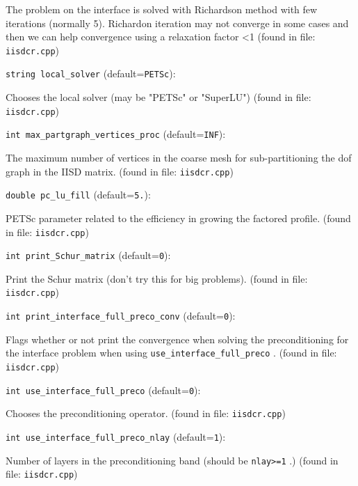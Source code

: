 The problem on the interface is solved with Richardson method
with few iterations (normally 5). Richardon iteration may not
converge in some cases and then we can help convergence using a
relaxation factor <1
 (found in file: \verb+iisdcr.cpp+)
\item\verb+string local_solver+ {\rm(default=\verb|PETSc|)}:

Chooses the local solver (may be "PETSc" or "SuperLU")
 (found in file: \verb+iisdcr.cpp+)
\item\verb+int max_partgraph_vertices_proc+ {\rm(default=\verb|INF|)}:

The maximum number of vertices in the coarse mesh for
sub-partitioning the dof graph in the IISD matrix. 
 (found in file: \verb+iisdcr.cpp+)
\item\verb+double pc_lu_fill+ {\rm(default=\verb|5.|)}:

PETSc parameter related to the efficiency in growing
  the factored profile.
 (found in file: \verb+iisdcr.cpp+)
\item\verb+int print_Schur_matrix+ {\rm(default=\verb|0|)}:

Print the Schur matrix (don't try this for big problems).
 (found in file: \verb+iisdcr.cpp+)
\item\verb+int print_interface_full_preco_conv+ {\rm(default=\verb|0|)}:

Flags whether or not print the convergence when solving the
preconditioning for the interface problem when using
 \verb+use_interface_full_preco+ .
 (found in file: \verb+iisdcr.cpp+)
\item\verb+int use_interface_full_preco+ {\rm(default=\verb|0|)}:

Chooses the preconditioning operator. 
 (found in file: \verb+iisdcr.cpp+)
\item\verb+int use_interface_full_preco_nlay+ {\rm(default=\verb|1|)}:

Number of layers in the preconditioning band (should
 be  \verb+nlay>=1+ .) 
 (found in file: \verb+iisdcr.cpp+)
